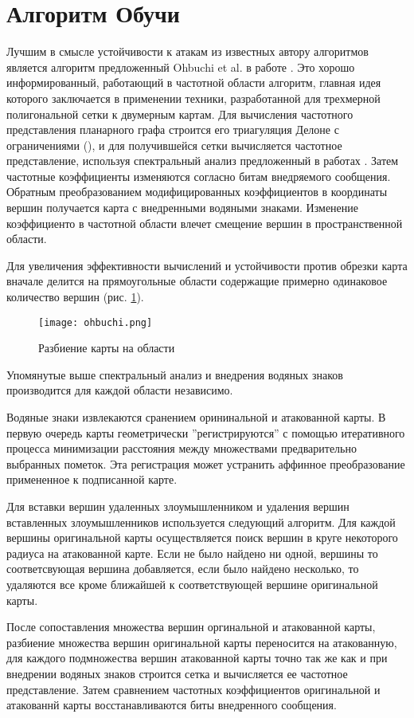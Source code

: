 \section{Алгоритм Обучи}
\label{sec:base}

Лучшим в смысле устойчивости к атакам из известных автору алгоритмов является алгоритм предложенный 
Ohbuchi et al. в работе \cite{Ohbuchi}. Это хорошо информированный, работающий в частотной области алгоритм,
главная идея которого заключается в применении техники, разработанной для трехмерной полигональной сетки к
двумерным картам.
Для вычисления частотного представления планарного графа строится его триагуляция Делоне с ограничениями 
(\cite{Chew}), и для получившейся сетки вычисляется частотное представление, используя спектральный анализ 
предложенный в работах \cite{Karni1, Karni2}. Затем частотные коэффициенты изменяются согласно битам 
внедряемого сообщения. Обратным преобразованием модифицированных коэффициентов в координаты вершин получается
карта с внедренными водяными знаками. Изменение коэффициенто в частотной области влечет смещение вершин в 
пространственной области.

Для увеличения эффективности вычислений и устойчивости против обрезки карта вначале делится на прямоугольные 
области содержащие примерно одинаковое количество вершин (рис. \ref{pic_ohbuchi}). 
\begin{figure}
  \centering
  \texttt{[image: ohbuchi.png]}
  \caption{Разбиение карты на области}
  \label{pic_ohbuchi}
\end{figure}
Упомянутые выше спектральный анализ и внедрения водяных знаков производится для каждой области независимо.

Водяные знаки извлекаются сранением орининальной и атакованной карты. В первую очередь карты геометрически
''регистрируются'' с помощью итеративного процесса минимизации расстояния между множествами предварительно
выбранных пометок. Эта регистрация может устранить аффинное преобразование примененное к подписанной карте.

Для вставки вершин удаленных злоумышленником и удаления вершин вставленных злоумышленников используется 
следующий алгоритм. Для каждой вершины оригинальной
карты осуществляется поиск вершин в круге некоторого радиуса на атакованной карте. Если не было найдено ни одной,
вершины то соответсвующая вершина добавляется, если было найдено несколько, то удаляются все кроме ближайшей
к соответствующей вершине оригинальной карты.

После сопоставления множества вершин оргинальной и атакованной карты, разбиение множества
вершин оригинальной карты переносится на атакованную, для каждого подмножества вершин атакованной
карты точно так же как и при внедрении водяных знаков строится сетка и вычисляется ее частотное
представление. Затем сравнением частотных коэффициентов оригинальной и атакованнй карты
восстанавливаются биты внедренного сообщения. 

